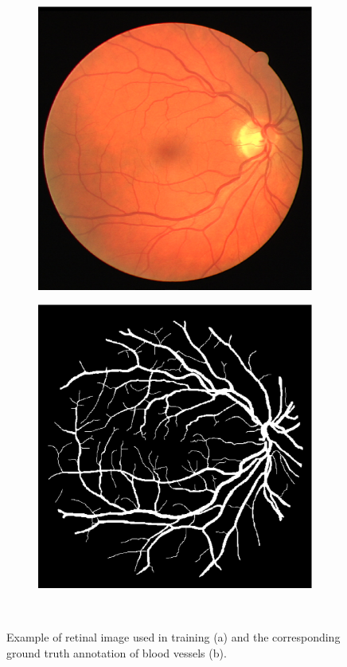 \documentclass[aps,prb,10pt,twocolumn,groupedaddress]{revtex4-1}
\begin{document}
\begin{figure}[!t]
	\centering
	\begin{subfigure}[]{0.45\textwidth}
		\centering
		\includegraphics[width=\textwidth]{images/02_training.eps}
		\caption{}
	\end{subfigure}
	\hspace{1cm}
	\centering
	\begin{subfigure}[]{0.45\textwidth}
		\centering
		\includegraphics[width=\textwidth]{images/02_manual1.eps}
		\caption{}
	\end{subfigure}\\
	\caption{Example of retinal image used in training (a) and the corresponding ground truth annotation of blood vessels (b).}
	\label{fig:example_images}
\end{figure}
\end{document}
